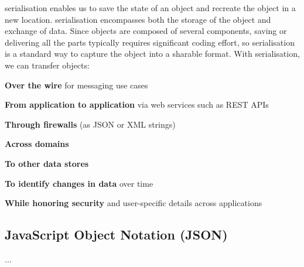 \documentclass[../report.tex]{subfiles}
\begin{document}
serialisation enables us to save the state of an object and recreate the object in a new location. serialisation encompasses both the storage of the object and exchange of data. Since objects are composed of several components, saving or delivering all the parts typically requires significant coding effort, so serialisation is a standard way to capture the object into a sharable format. With serialisation, we can transfer objects:

\textbf{Over the wire} for messaging use cases

\textbf{From application to application} via web services such as REST APIs

\textbf{Through firewalls} (as JSON or XML strings)

\textbf{Across domains}

\textbf{To other data stores}

\textbf{To identify changes in data} over time

\textbf{While honoring security} and user-specific details across applications

\subsection{JavaScript Object Notation (JSON)}

...
\end{document}
